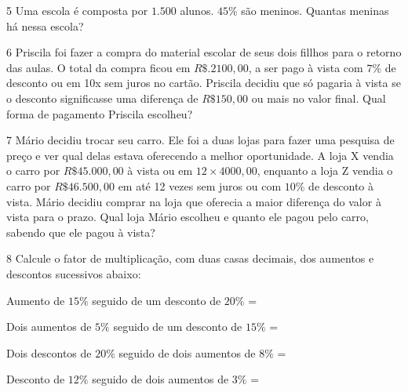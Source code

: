 \num{5} Uma escola é composta por $1.500$ alunos. $45\%$ são meninos. Quantas
meninas há nessa escola?


\num{6} Priscila foi fazer a compra do material escolar de seus dois fillhos
para o retorno das aulas. O total da compra ficou em $R\$.2100,00$, a ser
pago à vista com $7\%$ de desconto ou em 10x sem juros no cartão. Priscila
decidiu que só pagaria à vista se o desconto significasse uma diferença
de $R\$150,00$ ou mais no valor final. Qual forma de pagamento Priscila
escolheu?



\num{7} Mário decidiu trocar seu carro. Ele foi a duas lojas para fazer uma
pesquisa de preço e ver qual delas estava oferecendo a melhor
oportunidade. A loja X vendia o carro por $R\$45.000,00$ à vista ou em
$12 \times 4000,00$, enquanto a loja Z vendia o carro por $R\$46.500,00$
em até 12 vezes sem juros ou com $10\%$ de desconto à vista. Mário decidiu
comprar na loja que oferecia a maior diferença do valor à vista para o
prazo. Qual loja Mário escolheu e quanto ele pagou pelo carro, sabendo
que ele pagou à vista?


\num{8} Calcule o fator de multiplicação, com duas casas decimais, dos
aumentos e descontos sucessivos abaixo:
    
\begin{escolha}
    \item Aumento de $15\%$ seguido de um desconto de $20\%$  =  \\
    \item Dois aumentos de $5\%$ seguido de um desconto de $15\%$  =  \\
    \item Dois descontos de $20\%$ seguido de dois aumentos de $8\%$  =  \\
    \item Desconto de $12\%$ seguido de dois aumentos de $3\%$  =  
\end{escolha}

